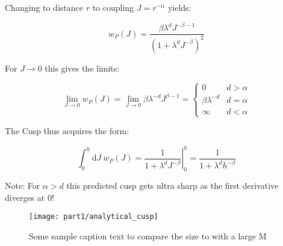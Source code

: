 Changing to distance $r$ to coupling $J=r^{-\alpha}$ yields:

\begin{equation}
	w_P(J) = \frac{\beta\lambda^d J^{-\beta-1}}{\left(1+\lambda^{d}J^{-\beta}\right)^2}
\end{equation}

For $J\rightarrow 0$ this gives the limits:

\begin{equation}
	\lim_{J\rightarrow0} w_P(J) = \lim_{J\rightarrow0} \beta\lambda^{-d} J^{\beta-1} =\begin{cases}0 & d>\alpha\\ \beta\lambda^{-d} & d=\alpha\\ \infty & d<\alpha\end{cases}
\end{equation}

The Cusp thus acquires the form:

\begin{equation}
	\int_0^h\! \mathrm{d}J\ w_P(J) = \left. \frac{1}{1+\lambda^{d}J^{-\beta}}\right|_{0}^h = \frac{1}{1+\lambda^{d}h^{-\beta}}
\end{equation}

Note: For $\alpha > d$ this predicted cusp gets ultra sharp as the first derivative diverges at $0$!

\begin{figure}[ht]
	\centering
	\texttt{[image: part1/analytical\_cusp]}
	\caption{Some sample caption text to compare the size to with a large M}
	\label{fig:analytical-cusp}
\end{figure}